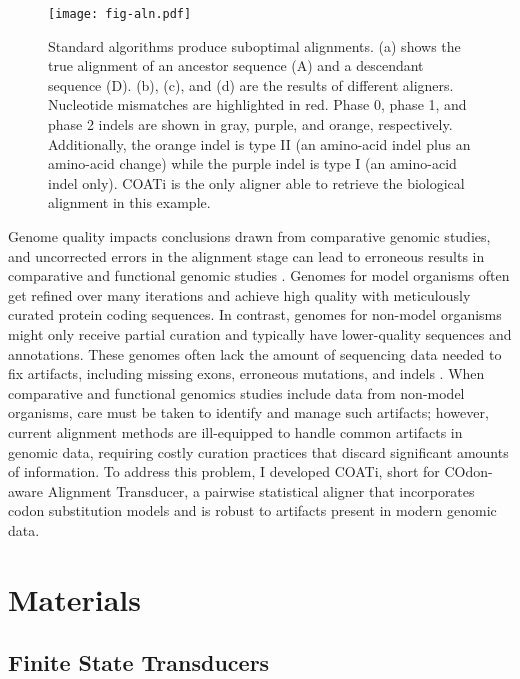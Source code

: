 \begin{figure}[!ht]
    \centering%
    \texttt{[image: fig-aln.pdf]}
    \par
    \caption[Suboptimal alignments and indel phases]{
        Standard algorithms produce suboptimal alignments.
        (a) shows the true alignment of an ancestor sequence (A) and a descendant sequence (D).
        (b), (c), and (d) are the results of different aligners.
        Nucleotide mismatches are highlighted in red. Phase 0, phase 1, and phase 2 indels are shown in gray, purple, and orange, respectively.
        Additionally, the orange indel is type II (an amino-acid indel plus an amino-acid change) while the purple indel is type I (an amino-acid indel only).
        COATi is the only aligner able to retrieve the biological alignment in this example.
        }
    \label{fig:aln}
\end{figure}

Genome quality impacts conclusions drawn from comparative genomic studies, and uncorrected errors in the alignment stage can lead to erroneous results in comparative and functional genomic studies \citep{estimates_schneider_2009,effect_fletcher_2010,hubisz2011error}.
Genomes for model organisms often get refined over many iterations and achieve high quality with meticulously curated protein coding sequences.
In contrast, genomes for non-model organisms might only receive partial curation and typically have lower-quality sequences and annotations.
These genomes often lack the amount of sequencing data needed to fix artifacts, including missing exons, erroneous mutations, and indels \citep{jackman2018tigmint}.
%
When comparative and functional genomics studies include data from non-model organisms, care must be taken to identify and manage such artifacts; however,
current alignment methods are ill-equipped to handle common artifacts in genomic data, requiring costly curation practices that discard significant amounts of information.
To address this problem, I developed COATi, short for COdon-aware Alignment Transducer, a pairwise statistical aligner that incorporates codon substitution models and is robust to artifacts present in modern genomic data.

\section{Materials}

\subsection{Finite State Transducers}

